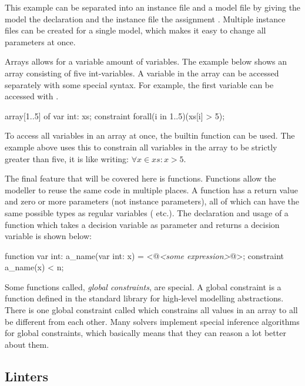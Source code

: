 \documentclass[a4paper,12pt]{article}
\newcommand{\mi}[1]{\mbox{\mzninline{#1}}}
\begin{document}
This example can be separated into an instance file and a model file by giving
the model the declaration {\mi{int: n}} and the
instance file the assignment \mi{n = 5}. Multiple instance files can be created
for a single model, which makes it easy to change all parameters at once.

Arrays allows for a variable amount of variables. The example below shows an array \mi{xs}
consisting of five int-variables. A variable in the array can be accessed separately with
some special syntax. For example, the first variable can be accessed with
\mi{xs[1]}.
\begin{mznnobreak}
array[1..5] of var int: xs;
constraint forall(i in 1..5)(xs[i] > 5);
\end{mznnobreak}
To access all variables in an array at once, the builtin function \mi{forall} can be used.
The example above uses this to constrain all variables in the array to be strictly greater
than five, it is like writing: $\forall x \in xs : x > 5$.

The final feature that will be covered here is functions. Functions allow the modeller to
reuse the same code in multiple places. A function has a return value and zero or more
parameters (not instance parameters), all of which can have the same possible types as
regular variables (\mi{int} etc.). The declaration and usage of a function which takes a decision variable as
parameter and returns a decision variable is shown below:
\begin{mznnobreak}
function var int: a_name(var int: x) = <@\textit{<some expression>}@>;
constraint a_name(x) < n;
\end{mznnobreak}

Some functions called, \emph{global constraints}, are special. A global constraint is a
function defined in the standard library for high-level modelling abstractions. There is
one global constraint called \mi{all_different} which constrains all values in an array to
all be different from each other. Many solvers implement special inference algorithms for
global constraints, which basically means that they can reason a lot better about them.

\subsection{Linters}\label{sec:bkg:linter}
\end{document}
